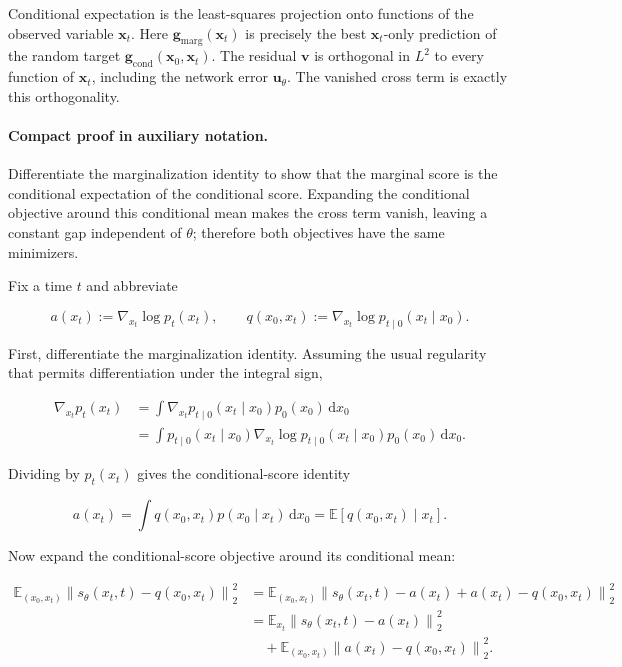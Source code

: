 \documentclass[11pt,a4paper]{article}
\theoremstyle{definition}
\begin{document}
\begin{note}
Conditional expectation is the least-squares projection onto functions of the observed
variable $\mathbf{x}_t$. Here
$\mathbf{g}_{\mathrm{marg}}(\mathbf{x}_t)$ is precisely the best
$\mathbf{x}_t$-only prediction of the random target
$\mathbf{g}_{\mathrm{cond}}(\mathbf{x}_0,\mathbf{x}_t)$. The residual
$\mathbf{v}$ is orthogonal in $L^2$ to every function of $\mathbf{x}_t$, including the
network error $\mathbf{u}_\theta$. The vanished cross term is exactly this orthogonality.
\end{note}

\paragraph{Compact proof in auxiliary notation.}
Differentiate the marginalization identity to show that the marginal score is the conditional expectation of the conditional score. Expanding the conditional objective around this conditional mean makes the cross term vanish, leaving a constant gap independent of $\theta$; therefore both objectives have the same minimizers.

Fix a time $t$ and abbreviate

\[
a(x_t):=\nabla_{x_t}\log p_t(x_t),
\qquad
q(x_0,x_t):=\nabla_{x_t}\log p_{t\mid 0}(x_t\mid x_0).
\]

First, differentiate the marginalization identity. Assuming the usual regularity that permits differentiation under the integral sign,

\begin{align*}
\nabla_{x_t}p_t(x_t)
&= \int \nabla_{x_t}p_{t\mid 0}(x_t\mid x_0)p_0(x_0)\,\mathrm{d}x_0 \\
&= \int p_{t\mid 0}(x_t\mid x_0)
   \nabla_{x_t}\log p_{t\mid 0}(x_t\mid x_0)p_0(x_0)\,\mathrm{d}x_0.
\end{align*}

Dividing by $p_t(x_t)$ gives the conditional-score identity

\[
a(x_t)
= \int q(x_0,x_t)p(x_0\mid x_t)\,\mathrm{d}x_0
= \mathbb{E}\left[q(x_0,x_t)\mid x_t\right].
\]

Now expand the conditional-score objective around its conditional mean:

\begin{align*}
\mathbb{E}_{(x_0,x_t)}\left\|s_\theta(x_t,t)-q(x_0,x_t)\right\|_2^2
&= \mathbb{E}_{(x_0,x_t)}
   \left\|s_\theta(x_t,t)-a(x_t)+a(x_t)-q(x_0,x_t)\right\|_2^2 \\
&= \mathbb{E}_{x_t}\left\|s_\theta(x_t,t)-a(x_t)\right\|_2^2 \\
&\quad + \mathbb{E}_{(x_0,x_t)}\left\|a(x_t)-q(x_0,x_t)\right\|_2^2.
\end{align*}
\end{document}
